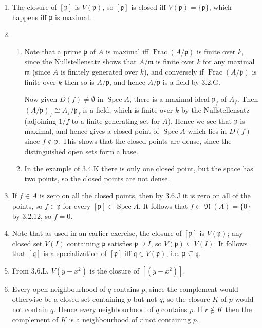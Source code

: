 \documentclass{report}
\newcommand{\m}{\mathfrak{m}}
\newcommand{\p}{\mathfrak{p}}
\newcommand{\q}{\mathfrak{q}}
\DeclareMathOperator{\Frac}{Frac}
\DeclareMathOperator{\Spec}{Spec}
\DeclareMathOperator{\nilrad}{\mathfrak{N}}
\begin{document}
\begin{enumerate}[label=\textbf{3.6.\Alph*.}]
	\item The closure of $[\p]$ is $V(\p)$, so $[\p]$ is closed iff
	      $V(\p)=\{\p\}$, which happens iff $\p$ is maximal.

	\item
	      \begin{enumerate}[label=(\alph*)]
		      \item Note that a prime $\p$ of $A$ is maximal iff $\Frac(A/\p)$
		            is finite over $k$, since the Nullstellensatz shows that
		            $A/\m$ is finite over $k$ for any maximal $\m$ (since $A$ is
		            finitely generated over $k$), and conversely if $\Frac(A/\p)$
		            is finite over $k$ then so is $A/\p$, and hence $A/\p$ is a
		            field by 3.2.G.

		            Now given $D(f)\ne\emptyset$ in $\Spec A$, there is a maximal
		            ideal $\p_f$ of $A_f$. Then $(A/\p)_f\cong A_f/\p_f$ is a
		            field, which is finite over $k$ by the Nullstellensatz
		            (adjoining $1/f$ to a finite generating set for $A$). Hence we
		            see that $\p$ is maximal, and hence gives a closed point of
		            $\Spec A$ which lies in $D(f)$ since $f\notin\p$. This shows
		            that the closed points are dense, since the distinguished open
		            sets form a base.

		      \item In the example of 3.4.K there is only one closed point, but
		            the space has two points, so the closed points are not dense.
	      \end{enumerate}

	\item If $f\in A$ is zero on all the closed points, then by 3.6.J it is zero
	      on all of the points, so $f\in\p$ for every $[\p]\in\Spec A$. It follows
	      that $f\in\nilrad(A)=\{0\}$ by 3.2.12, so $f=0$.

	\item Note that as used in an earlier exercise, the closure of $[\p]$ is
	      $V(\p)$; any closed set $V(I)$ containing $\p$ satisfies $\p\supseteq I$,
	      so $V(\p)\subseteq V(I)$. It follows that $[\q]$ is a specialization of
	      $[\p]$ iff $\q\in V(\p)$, i.e. $\p\subseteq\q$.

	\item From 3.6.L, $V(y-x^2)$ is the closure of $[(y-x^2)]$.

	\item Every open neighbourhood of $q$ contains $p$, since the complement
	      would otherwise be a closed set containing $p$ but not $q$, so the
	      closure $K$ of $p$ would not contain $q$. Hence every neighbourhood of
	      $q$ contains $p$. If $r\notin K$ then the complement of $K$ is a
	      neighbourhood of $r$ not containing $p$.


\end{enumerate}
\end{document}
